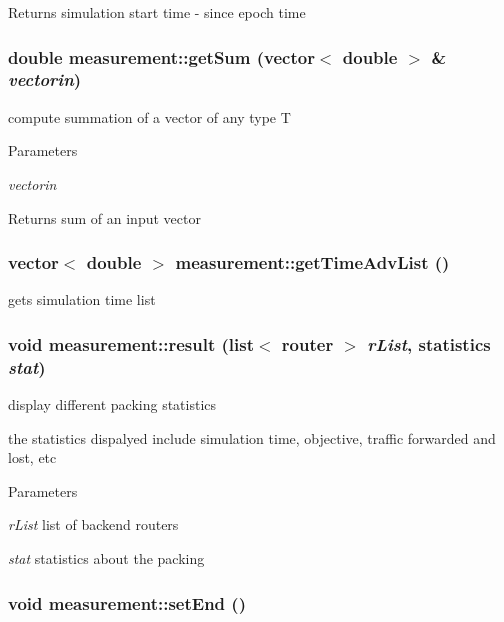 \begin{DoxyReturn}{Returns}
simulation start time -\/ since epoch time 
\end{DoxyReturn}
\hypertarget{classmeasurement_ab734bbbfdfa01be67553368501b32189}{
\subsubsection[{getSum}]{\setlength{\rightskip}{0pt plus 5cm}double measurement::getSum (vector$<$ double $>$ \& {\em vectorin})}}
\label{classmeasurement_ab734bbbfdfa01be67553368501b32189}


compute summation of a vector of any type T 


\begin{DoxyParams}{Parameters}
\item[{\em vectorin}]\end{DoxyParams}
\begin{DoxyReturn}{Returns}
sum of an input vector 
\end{DoxyReturn}
\hypertarget{classmeasurement_a83e8db5de390ad5efa9937a4db67c228}{
\subsubsection[{getTimeAdvList}]{\setlength{\rightskip}{0pt plus 5cm}vector$<$ double $>$ measurement::getTimeAdvList ()}}
\label{classmeasurement_a83e8db5de390ad5efa9937a4db67c228}


gets simulation time list 

\hypertarget{classmeasurement_a18838caa4a3b08613e822aeb449d91ba}{
\subsubsection[{result}]{\setlength{\rightskip}{0pt plus 5cm}void measurement::result (list$<$ {\bf router} $>$ {\em rList}, \/  {\bf statistics} {\em stat})}}
\label{classmeasurement_a18838caa4a3b08613e822aeb449d91ba}


display different packing statistics 

the statistics dispalyed include simulation time, objective, traffic forwarded and lost, etc 
\begin{DoxyParams}{Parameters}
\item[{\em rList}]list of backend routers \item[{\em stat}]statistics about the packing \end{DoxyParams}
\hypertarget{classmeasurement_adfeee2a53faaa6c4de885f274e31e84f}{
\subsubsection[{setEnd}]{\setlength{\rightskip}{0pt plus 5cm}void measurement::setEnd ()}}
\label{classmeasurement_adfeee2a53faaa6c4de885f274e31e84f}


